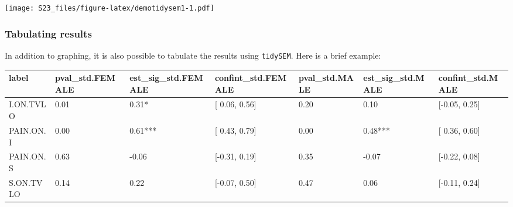 \documentclass[
]{book}
\newenvironment{Shaded}{\begin{snugshade}}{\end{snugshade}}
\newcommand{\AttributeTok}[1]{\textcolor[rgb]{0.77,0.63,0.00}{#1}}
\newcommand{\CommentTok}[1]{\textcolor[rgb]{0.56,0.35,0.01}{\textit{#1}}}
\newcommand{\ConstantTok}[1]{\textcolor[rgb]{0.00,0.00,0.00}{#1}}
\newcommand{\DecValTok}[1]{\textcolor[rgb]{0.00,0.00,0.81}{#1}}
\newcommand{\FunctionTok}[1]{\textcolor[rgb]{0.00,0.00,0.00}{#1}}
\newcommand{\NormalTok}[1]{#1}
\newcommand{\OtherTok}[1]{\textcolor[rgb]{0.56,0.35,0.01}{#1}}
\newcommand{\SpecialCharTok}[1]{\textcolor[rgb]{0.00,0.00,0.00}{#1}}
\newcommand{\StringTok}[1]{\textcolor[rgb]{0.31,0.60,0.02}{#1}}
\begin{document}
\texttt{[image: S23\_files/figure-latex/demotidysem1-1.pdf]}

\hypertarget{tabulating-results}{%
\subsubsection{Tabulating results}\label{tabulating-results}}

In addition to graphing, it is also possible to tabulate the results using \texttt{tidySEM}.
Here is a brief example:

\begin{Shaded}
\end{Shaded}

\begin{tabular}[t]{l|l|l|l|l|l|l}
\hline
label & pval\_std.FEMALE & est\_sig\_std.FEMALE & confint\_std.FEMALE & pval\_std.MALE & est\_sig\_std.MALE & confint\_std.MALE\\
\hline
I.ON.TVLO & 0.01 & 0.31* & [ 0.06,  0.56] & 0.20 & 0.10 & [-0.05,  0.25]\\
\hline
PAIN.ON.I & 0.00 & 0.61*** & [ 0.43,  0.79] & 0.00 & 0.48*** & [ 0.36,  0.60]\\
\hline
PAIN.ON.S & 0.63 & -0.06 & [-0.31,  0.19] & 0.35 & -0.07 & [-0.22,  0.08]\\
\hline
S.ON.TVLO & 0.14 & 0.22 & [-0.07,  0.50] & 0.47 & 0.06 & [-0.11,  0.24]\\
\hline
\end{tabular}
\end{document}
